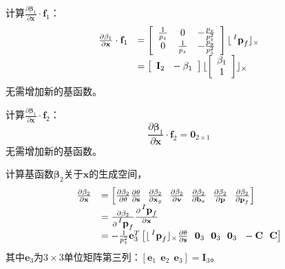 \documentclass{article}
\begin{document}
计算$\frac{\partial\mathbf{\beta}_1}{\partial\textbf{x}}\cdot\textbf{f}_1$：
\begin{equation}
    \begin{array}{ll}
        \frac{\partial\mathbf{\beta}_1}{\partial\textbf{x}}\cdot\textbf{f}_1
        &=\left[\begin{array}{ccc} \frac{1}{p_z}&0&-\frac{p_x}{p_z^2}\\
        0&\frac{1}{p_z}&-\frac{p_y}{p_z^2} \end{array}\right]
        \lfloor\sideset{^I}{}{\mathop{\textbf{p}_f}} \rfloor_{\times}\\
        &=\left[\begin{array}{cc} \textbf{I}_{2}\ \ -\mathbf{\beta}_{1} \end{array}\right]
        \lfloor\left[\begin{array}{c}\mathbf{\beta}_1\\1 \end{array}\right] \rfloor_{\times}
    \end{array}
\end{equation}
无需增加新的基函数。
\par
计算$\frac{\partial\mathbf{\beta}_1}{\partial\textbf{x}}\cdot\textbf{f}_2$：
\begin{equation}
    \frac{\partial\mathbf{\beta}_1}{\partial\textbf{x}}\cdot\textbf{f}_2=\textbf{0}_{2\times 1}
\end{equation}
无需增加新的基函数。

\par
计算基函数$\mathbf{\beta}_2$关于$\textbf{x}$的生成空间，
\begin{equation}
    \begin{array}{ll}\frac{\partial\mathbf{\beta}_2}{\partial\textbf{x}}
        &=\left[\frac{\partial\mathbf{\beta}_2}{\partial\mathbf{\theta}}\frac{\partial\mathbf{\theta}}{\partial\textbf{s}}
        \ \ \frac{\partial\mathbf{\beta}_2}{\partial\textbf{x}_{g}}\ \ \frac{\partial\mathbf{\beta}_2}{\partial\textbf{v}}
        \ \ \frac{\partial\mathbf{\beta}_2}{\partial\textbf{b}_{a}}\ \ \frac{\partial\mathbf{\beta}_2}{\partial\textbf{p}}
        \ \ \frac{\partial\mathbf{\beta}_2}{\partial\textbf{p}_f}\right]\\
        &=\frac{\partial\mathbf{\beta}_2}{\partial\sideset{^I}{}{\mathop{\textbf{p}_{f}}}}
        \frac{\partial\sideset{^I}{}{\mathop{\textbf{p}_{f}}}}{\partial\textbf{x}}\\
        &=-\frac{1}{p_z^2}\textbf{e}_{3}^{T}
            \left[\lfloor\sideset{^I}{}{\mathop{\textbf{p}_{f}}}\rfloor_{\times}\frac{\partial\mathbf{\theta}}{\partial\textbf{s}}
            \ \ \textbf{0}_3\ \ \textbf{0}_3\ \ \textbf{0}_3\ \ -\textbf{C}\ \ \textbf{C}
            \right]
    \end{array}
\end{equation}
其中$\textbf{e}_3$为$3\times 3$单位矩阵第三列：$\left[\textbf{e}_1\ \ \textbf{e}_2\ \ \textbf{e}_3\right]=\textbf{I}_3$。
\end{document}
